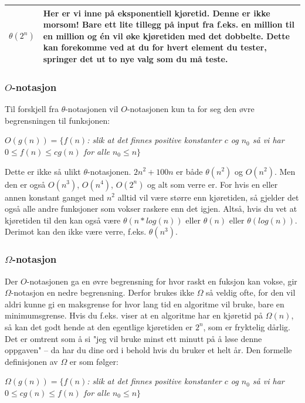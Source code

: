 \begin{table}[H]
\begin{tabular}{|L{5em} | L{35em}|}
        $\theta(2^n)$ & Her er vi inne på eksponentiell kjøretid. Denne er ikke morsom! Bare ett lite tillegg på input fra f.eks. en million til en million og én vil øke kjøretiden med det dobbelte. Dette kan forekomme ved at du for hvert element du tester, springer det ut to nye valg som du må teste.\\
         \hline
    \end{tabular}
\end{table}

\subsubsection{$O$-notasjon}
Til forskjell fra $\theta$-notasjonen vil $O$-notasjonen kun ta for seg den øvre begrensningen til funksjonen:

\begin{center}
\textit{$O(g(n)) = \{ f(n)$: slik at det finnes positive konstanter $c$ og $n_0$ så vi har $0 \leq f(n) \leq cg(n)$ for alle $n_0 \leq n \}$}
\end{center}

\noindent Dette er ikke så ulikt $\theta$-notasjonen. $2n^2 + 100n$ er både $\theta(n^2)$ og $O(n^2)$. Men den er også $O(n^3)$, $O(n^4)$, $O(2^n)$ og alt som verre er. For hvis en eller annen konstant ganget med $n^2$ alltid vil være større enn kjøretiden, så gjelder det også alle andre funksjoner som vokser raskere enn det igjen. Altså, hvis du vet at kjøretiden til den kan også være $\theta(n*log(n))$ eller $\theta(n)$ eller $\theta(log(n))$. Derimot kan den ikke være verre, f.eks. $\theta(n^3)$.

\subsubsection{$\Omega$-notasjon}
Der $O$-notasjonen ga en øvre begrensning for hvor raskt en fuksjon kan vokse, gir $\Omega$-notasjon en nedre begrensning. Derfor brukes ikke $\Omega$ så veldig ofte, for den vil aldri kunne gi en maksgrense for hvor lang tid en algoritme vil bruke, bare en minimumsgrense. Hvis du f.eks. viser at en algoritme har en kjøretid på $\Omega(n)$, så kan det godt hende at den egentlige kjøretiden er $2^n$, som er fryktelig dårlig. Det er omtrent som å si "jeg vil bruke minst ett minutt på å løse denne oppgaven" – da har du dine ord i behold hvis du bruker et helt år. Den formelle definisjonen av $\Omega$ er som følger:

\begin{center}
\textit{$\Omega(g(n)) = \{ f(n)$: slik at det finnes positive konstanter $c$ og $n_0$ så vi har $0 \leq cg(n) \leq f(n)$ for alle $n_0 \leq n \}$}
\end{center}

